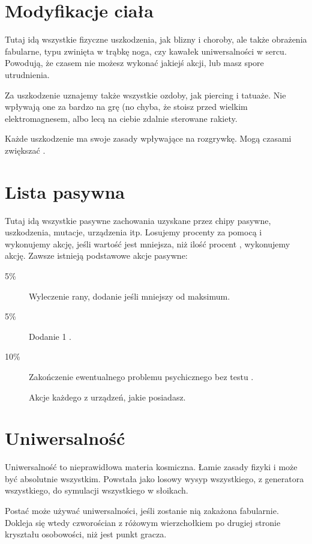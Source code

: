 \section{Modyfikacje ciała}
Tutaj idą wszystkie fizyczne uszkodzenia, jak blizny i choroby, ale także obrażenia fabularne, typu zwinięta w trąbkę noga, czy kawałek uniwersalności w sercu.
Powodują, że czasem nie możesz wykonać jakiejś akcji, lub masz spore utrudnienia.

Za uszkodzenie uznajemy także wszystkie ozdoby, jak piercing i tatuaże.
Nie wpływają one za bardzo na grę (no chyba, że stoisz przed wielkim elektromagnesem, albo lecą na ciebie zdalnie sterowane rakiety.

Każde uszkodzenie ma swoje zasady wpływające na rozgrywkę.
Mogą czasami zwiększać \abnkp{}.

\section{Lista pasywna}
Tutaj idą wszystkie pasywne zachowania uzyskane przez chipy pasywne, uszkodzenia, mutacje, urządzenia itp.
Losujemy procenty za pomocą \dc{} i wykonujemy akcję, jeśli wartość jest mniejsza, niż ilość procent , wykonujemy akcję.
Zawsze istnieją podstawowe akcje pasywne:
\begin{description}
	\item[5\%] Wyleczenie rany, dodanie \abzyc{} jeśli mniejszy od maksimum.
	\item[5\%] Dodanie 1 \abkar{}.
	\item[10\%] Zakończenie ewentualnego problemu psychicznego bez testu \abh{}.
	\item[] Akcje każdego z urządzeń, jakie posiadasz.
\end{description}

\section{Uniwersalność}
Uniwersalność to nieprawidłowa materia kosmiczna. Łamie zasady fizyki i może być absolutnie wszystkim.
Powstała jako losowy wysyp wszystkiego, z generatora wszystkiego, do symulacji wszystkiego w słoikach.

Postać może używać uniwersalności, jeśli zostanie nią zakażona fabularnie.
Dokleja się wtedy czworościan z różowym wierzchołkiem \abu{} po drugiej stronie kryształu osobowości, niż jest punkt gracza.

